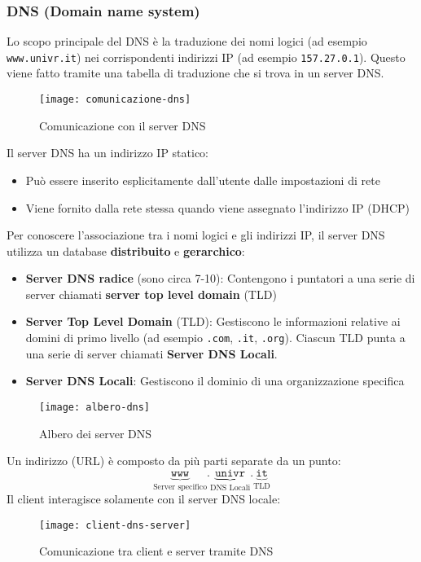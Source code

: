 \documentclass[a4paper]{article}
\begin{document}
\subsubsection{DNS (Domain name system)}
Lo scopo principale del DNS è la traduzione dei nomi logici (ad esempio\\
\texttt{www.univr.it}) nei corrispondenti indirizzi IP (ad esempio \texttt{157.27.0.1}).
Questo viene fatto tramite una tabella di traduzione che si trova in un server DNS.
\begin{figure}[H]
  \centering
  \texttt{[image: comunicazione-dns]}
  \caption{Comunicazione con il server DNS}
\end{figure}
Il server DNS ha un indirizzo IP statico:
\begin{itemize}
  \item Può essere inserito esplicitamente dall'utente dalle impostazioni di rete
  \item Viene fornito dalla rete stessa quando viene assegnato l'indirizzo IP (DHCP)
\end{itemize}
Per conoscere l'associazione tra i nomi logici e gli indirizzi IP, il server DNS
utilizza un database \textbf{distribuito} e \textbf{gerarchico}:
\begin{itemize}
  \item \textbf{Server DNS radice} (sono circa 7-10): Contengono i puntatori a una serie di server
    chiamati \textbf{server top level domain} (TLD)

  \item \textbf{Server Top Level Domain} (TLD): Gestiscono le informazioni relative
    ai domini di primo livello (ad esempio \texttt{.com}, \texttt{.it}, \texttt{.org}).
    Ciascun TLD punta a una serie di server chiamati \textbf{Server DNS Locali}.

  \item \textbf{Server DNS Locali}: Gestiscono il dominio di una organizzazione specifica
\end{itemize}
\begin{figure}[H]
  \centering
  \texttt{[image: albero-dns]}
  \caption{Albero dei server DNS}
\end{figure}
Un indirizzo (URL) è composto da più parti separate da un punto:
\[
  \underbrace{\texttt{www}}_{\text{Server specifico}}.
  \underbrace{\texttt{univr}}_{\text{DNS Locali}}.
  \underbrace{\texttt{it}}_{\text{TLD}}
\]
Il client interagisce solamente con il server DNS locale:
\begin{figure}[H]
  \centering
  \texttt{[image: client-dns-server]}
  \caption{Comunicazione tra client e server tramite DNS}
\end{figure}
\end{document}
